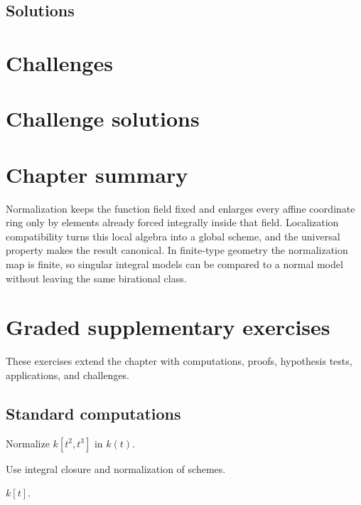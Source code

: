 \subsection*{Solutions}

\fi

\section{Challenges}






\ifdefined\IncludeChallengeSolutions
\section{Challenge solutions}

\fi

\section{Chapter summary}
Normalization keeps the function field fixed and enlarges every affine coordinate ring only by elements already
forced integrally inside that field.  Localization compatibility turns this local algebra into a global scheme,
and the universal property makes the result canonical.  In finite-type geometry the normalization map is finite,
so singular integral models can be compared to a normal model without leaving the same birational class.


\section{Graded supplementary exercises}
These exercises extend the chapter with computations, proofs, hypothesis tests, applications, and challenges.

\subsection*{Standard computations}

\begin{exercise}\label{exr:vi28-expand-01}
Normalize $k[t^2,t^3]$ in $k(t)$.
\end{exercise}
\begin{hint}
Use integral closure and normalization of schemes.
\end{hint}
\begin{solution}
$k[t]$.
\end{solution}

